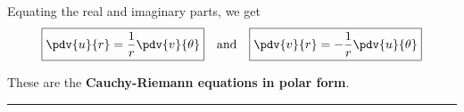 Equating the real and imaginary parts, we get
\begin{equation}
    \boxed{ \pdv{u}{r} = \frac{1}{r} \pdv{v}{\theta} }
    \quad \text{and} \quad 
    \boxed{ \pdv{v}{r} = -\frac{1}{r} \pdv{u}{\theta} }
\end{equation}

These are the \textbf{Cauchy-Riemann equations in polar form}.

\vspace{20pt}\rule{3in}{1pt}
